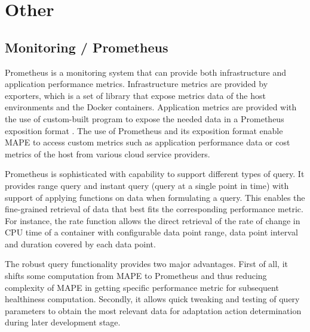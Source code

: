 \documentclass{seal_thesis}
\begin{document}
\section{Other}
\subsection{Monitoring / Prometheus}

Prometheus  is a monitoring system that can provide both infrastructure and application performance metrics.
Infrastructure metrics are provided by exporters, which is a set of library that expose metrics data of the host environments and the Docker containers.
Application metrics are provided with the use of custom-built program to expose the needed data in a Prometheus exposition format .
The use of Prometheus and its exposition format enable MAPE to access custom metrics such as application performance data or cost metrics of the host from various cloud service providers.

Prometheus is sophisticated with capability to support different types of query.
It provides range query and instant query (query at a single point in time) with support of applying functions on data when formulating a query.
This enables the fine-grained retrieval of data that best fits the corresponding performance metric.
For instance, the rate function allows the direct retrieval of the rate of change in CPU time of a container with configurable data point range, data point interval and duration covered by each data point.

The robust query functionality provides two major advantages.
First of all, it shifts some computation from MAPE to Prometheus and thus reducing complexity of MAPE in getting specific performance metric for subsequent healthiness computation.
Secondly, it allows quick tweaking and testing of query parameters to obtain the most relevant data for adaptation action determination during later development stage. 
\end{document}
